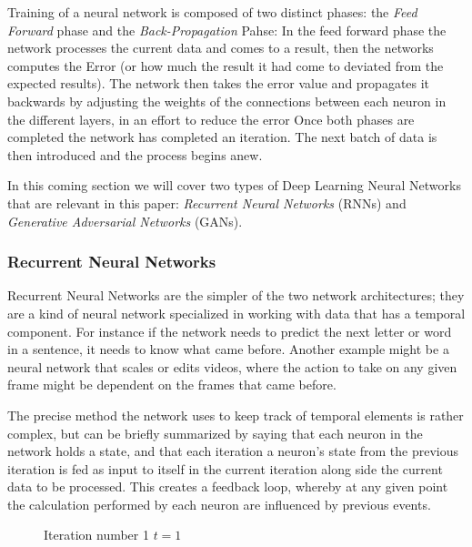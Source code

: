 Training of a neural network is composed of two distinct phases: the \emph{Feed Forward} phase and the \emph{Back-Propagation} Pahse: In the feed forward phase the network processes the current data and comes to a result, then the networks computes the Error (or how much the result it had come to deviated from the expected results). The network then takes the error value and propagates it backwards by adjusting 
the weights of the connections between each neuron in the different layers, in an effort to reduce the error
Once both phases are completed the network has completed an iteration. The next batch of data is then introduced and the process begins anew.

In this coming section we will cover two types of Deep Learning Neural Networks that are relevant in this paper: \emph{Recurrent Neural Networks} (RNNs) and  \emph{Generative Adversarial Networks} (GANs).

\subsubsection{Recurrent Neural Networks}
Recurrent Neural Networks are the simpler of the two network architectures; they are a kind of neural network specialized in working with data that has a temporal component.
For instance if the network needs to predict the next letter or word in a sentence, it needs to know what came before. Another example might be a neural network that scales or edits videos, where the action to take on any given frame might be dependent on the frames that came before.

The precise method the network uses to keep track of temporal elements is rather complex, but can be briefly summarized by saying that each neuron in the network holds a state, and that each iteration a neuron's state from the previous iteration is fed as input to itself in the current iteration along side the current data to be processed.
This creates a feedback loop, whereby at any given point the calculation performed by each neuron are influenced by previous events.

\begin{figure}[H]    
\centering
{}
\begin{center}
Iteration number 1 $t=1$
\end{center}
\end{figure}

